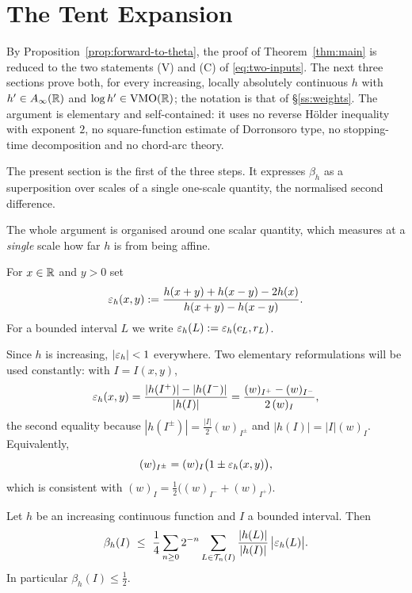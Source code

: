 \section{The Tent Expansion}\label{sec:tent}

By Proposition~\ref{prop:forward-to-theta}, the proof of
Theorem~\ref{thm:main} is reduced to the two statements (V) and (C) of
\eqref{eq:two-inputs}. The next three sections prove both, for every increasing,
locally absolutely continuous $h$ with $h'\in A_\infty(\mathbb{R})$ and
$\log h'\in\mathrm{VMO}(\mathbb{R})$; the notation is that of \S\ref{ss:weights}. The argument
is elementary and self-contained: it uses no reverse H\"older inequality with
exponent $2$, no square-function estimate of Dorronsoro type, no stopping-time
decomposition and no chord-arc theory.

The present section is the first of the three steps. It expresses $\beta_h$ as
a superposition over scales of a single one-scale quantity, the normalised
second difference.


The whole argument is organised around one scalar quantity, which measures at a
\emph{single} scale how far $h$ is from being affine.

\begin{definition}\label{def:eps}
	\leanok
	For $x\in\mathbb{R}$ and $y>0$ set
	\[
	\varepsilon_h(x,y):=\frac{h(x+y)+h(x-y)-2h(x)}{h(x+y)-h(x-y)} .
	\]
	For a bounded interval $L$ we write $\varepsilon_h(L):=\varepsilon_h(c_L,r_L)$.
\end{definition}

Since $h$ is increasing, $|\varepsilon_h|<1$ everywhere. Two elementary
reformulations will be used constantly: with $I=I(x,y)$,
\begin{equation}\label{eq:eps-forms}
	\varepsilon_h(x,y)=\frac{|h(I^+)|-|h(I^-)|}{|h(I)|}
	=\frac{(w)_{I^+}-(w)_{I^-}}{2\,(w)_{I}},
\end{equation}
the second equality because $|h(I^{\pm})|=\tfrac{|I|}2(w)_{I^{\pm}}$ and
$|h(I)|=|I|(w)_I$. Equivalently,
\begin{equation}\label{eq:eps-split}
	(w)_{I^{\pm}}=(w)_I\bigl(1\pm\varepsilon_h(x,y)\bigr),
\end{equation}
which is consistent with $(w)_I=\tfrac12\bigl((w)_{I^-}+(w)_{I^+}\bigr)$.

\begin{lemma}\label{lem:tent}
	\leanok
	Let $h$ be an increasing continuous function and $I$ a bounded interval. Then
	\[
	\beta_h(I)\ \le\ \frac14\sum_{n\ge0}2^{-n}
	\sum_{L\in\calT_n(I)}\frac{|h(L)|}{|h(I)|}\,\bigl|\eps_h(L)\bigr| .
	\]
	In particular $\beta_h(I)\le\frac12$.
\end{lemma}

